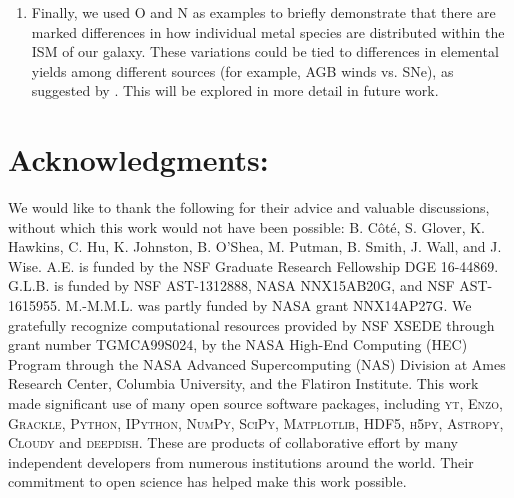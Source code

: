 \documentclass[twocolumn]{aastex61}
\begin{document}
\begin{enumerate}
\item Finally, we used O and N as examples to briefly demonstrate that there are marked differences in how individual metal species are distributed within the ISM of our galaxy. These variations could be tied to differences in elemental yields among different sources (for example, AGB winds vs. SNe), as suggested by \cite{KrumholzTing2018}. This will be explored in more detail in future work.
\end{enumerate}


\section*{Acknowledgments:} 
We would like to thank the following for their advice and valuable discussions, without which this work would not have been possible: B. C\^ot\'e, S. Glover, K. Hawkins, C. Hu, K. Johnston, B. O'Shea, M. Putman, B. Smith, J. Wall, and J. Wise. A.E. is funded by the NSF Graduate Research Fellowship DGE 16-44869. G.L.B. is funded by NSF AST-1312888, NASA NNX15AB20G, and NSF AST-1615955. M.-M.M.L. was partly funded by NASA  grant NNX14AP27G. We gratefully recognize computational resources provided by NSF XSEDE through grant number TGMCA99S024, by the NASA High-End Computing (HEC) Program through the NASA Advanced Supercomputing (NAS) Division at Ames Research Center, Columbia University, and the Flatiron Institute. This work made significant use of many open source software packages, including \textsc{yt}, \textsc{Enzo}, \textsc{Grackle}, \textsc{Python}, \textsc{IPython}, \textsc{NumPy}, \textsc{SciPy}, \textsc{Matplotlib}, \textsc{HDF5}, \textsc{h5py}, \textsc{Astropy}, \textsc{Cloudy} and \textsc{deepdish}. These are products of collaborative effort by many independent developers from numerous institutions around the world. Their commitment to open science has helped make this work possible. 




\appendix
\renewcommand\thefigure{\thesection.\arabic{figure}}    
\setcounter{figure}{0}
\end{document}
